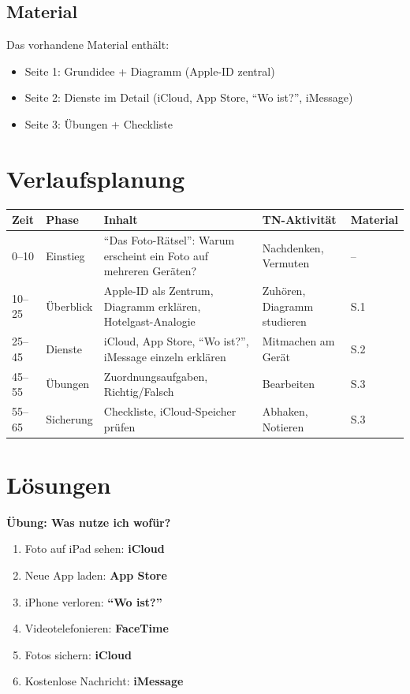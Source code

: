 \documentclass[11pt,a4paper]{article}
\begin{document}
\subsection{Material}
Das vorhandene Material enthält:
\begin{itemize}
    \item Seite 1: Grundidee + Diagramm (Apple-ID zentral)
    \item Seite 2: Dienste im Detail (iCloud, App Store, ``Wo ist?'', iMessage)
    \item Seite 3: Übungen + Checkliste
\end{itemize}

\section{Verlaufsplanung}

\begin{longtable}{|p{1cm}|p{2cm}|p{5cm}|p{3cm}|p{2cm}|}
\hline
\textbf{Zeit} & \textbf{Phase} & \textbf{Inhalt} & \textbf{TN-Aktivität} & \textbf{Material} \\
\hline
0--10 & Einstieg & ``Das Foto-Rätsel'': Warum erscheint ein Foto auf mehreren Geräten? & Nachdenken, Vermuten & -- \\
\hline
10--25 & Überblick & Apple-ID als Zentrum, Diagramm erklären, Hotelgast-Analogie & Zuhören, Diagramm studieren & S.1 \\
\hline
25--45 & Dienste & iCloud, App Store, ``Wo ist?'', iMessage einzeln erklären & Mitmachen am Gerät & S.2 \\
\hline
45--55 & Übungen & Zuordnungsaufgaben, Richtig/Falsch & Bearbeiten & S.3 \\
\hline
55--65 & Sicherung & Checkliste, iCloud-Speicher prüfen & Abhaken, Notieren & S.3 \\
\hline
\end{longtable}

\section{Lösungen}

\textbf{Übung: Was nutze ich wofür?}
\begin{enumerate}
    \item Foto auf iPad sehen: \textbf{iCloud}
    \item Neue App laden: \textbf{App Store}
    \item iPhone verloren: \textbf{``Wo ist?''}
    \item Videotelefonieren: \textbf{FaceTime}
    \item Fotos sichern: \textbf{iCloud}
    \item Kostenlose Nachricht: \textbf{iMessage}
\end{enumerate}
\end{document}
